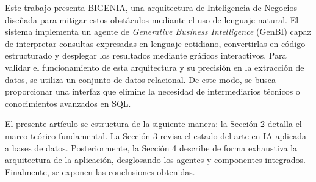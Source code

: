 Este trabajo presenta BIGENIA, una arquitectura de Inteligencia de Negocios
diseñada para mitigar estos obstáculos mediante el uso de lenguaje natural. El
sistema implementa un agente de \textit{Generative Business Intelligence}
(GenBI) capaz de interpretar consultas expresadas en lenguaje cotidiano,
convertirlas en código estructurado y desplegar los resultados mediante gráficos
interactivos. Para validar el funcionamiento de esta arquitectura y su
precisión en la extracción de datos, se utiliza un conjunto de datos relacional.
De este modo, se busca proporcionar una interfaz que elimine la necesidad de
intermediarios técnicos o conocimientos avanzados en SQL.

El presente artículo se estructura de la siguiente manera: la Sección 2 detalla el marco teórico fundamental.
La Sección 3 revisa el estado del arte en IA aplicada a bases de datos.
Posteriormente, la Sección 4 describe de forma exhaustiva la arquitectura de la
aplicación, desglosando los agentes y componentes integrados. Finalmente, se
exponen las conclusiones obtenidas.